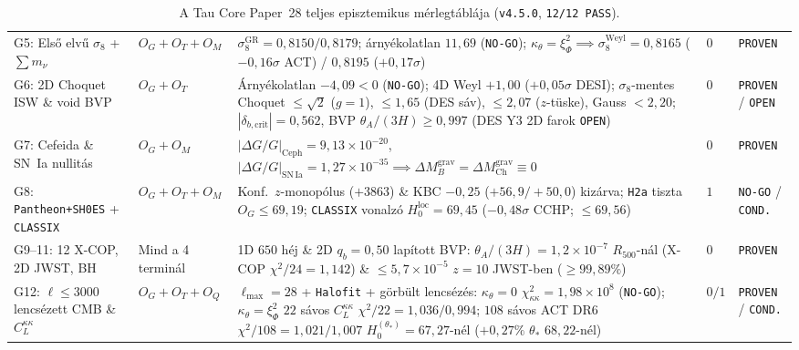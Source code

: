 \documentclass[11pt,a4paper]{article}
\begin{document}
\begin{table}[htbp]
{\begin{tabular}{ll>{\raggedright\arraybackslash}p{6.0cm}ll}
G5: Első elvű $\sigma_8$ + $\sum m_\nu$ & $O_G + O_T + O_M$ & $\sigma_8^{\mathrm{GR}} = 0{,}8150 / 0{,}8179$; árnyékolatlan $11{,}69$ ({\upshape\texttt{NO-GO}}); $\kappa_\theta = \xi_\Phi^2 \implies \sigma_8^{\mathrm{Weyl}} = 0{,}8165$ ($-0{,}16\sigma$ ACT) / $0{,}8195$ ($+0{,}17\sigma$) & $0$ & {\upshape\texttt{PROVEN}} \\
G6: 2D Choquet ISW \& void BVP & $O_G + O_T$ & Árnyékolatlan $-4{,}09 < 0$ ({\upshape\texttt{NO-GO}}); 4D Weyl $+1{,}00$ ($+0{,}05\sigma$ DESI); $\sigma_8$-mentes Choquet $\le \sqrt{2}$ ($g{=}1$), $\le 1{,}65$ (DES sáv), $\le 2{,}07$ ($z$-tüske), Gauss $< 2{,}20$; $|\delta_{b,\mathrm{crit}}| = 0{,}562$, BVP $\theta_A/(3H) \ge 0{,}997$ (DES Y3 2D farok {\upshape\texttt{OPEN}}) & $0$ & {\upshape\texttt{PROVEN}} / {\upshape\texttt{OPEN}} \\
G7: Cefeida \& SN~Ia nullitás & $O_G + O_M$ & $|\Delta G/G|_{\mathrm{Ceph}} = 9{,}13\times 10^{-20}$, $|\Delta G/G|_{\mathrm{SN\,Ia}} = 1{,}27\times 10^{-35} \implies \Delta M_B^{\mathrm{grav}} = \Delta M_{\mathrm{Ch}}^{\mathrm{grav}} \equiv 0$ & $0$ & {\upshape\texttt{PROVEN}} \\
G8: \texttt{Pantheon+SH0ES} + \texttt{CLASSIX} & $O_G + O_T + O_M$ & Konf.\ $z$-monopólus ($+3863$) \& KBC $-0{,}25$ ($+56{,}9 / +50{,}0$) kizárva; \texttt{H2a} tiszta $O_G \le 69{,}19$; \texttt{CLASSIX} vonalzó $H_0^{\mathrm{loc}} = 69{,}45$ ($-0{,}48\sigma$ CCHP; $\le 69{,}56$) & $1$ & {\upshape\texttt{NO-GO}} / {\upshape\texttt{COND.}} \\
G9--11: 12 X-COP, 2D JWST, BH & Mind a 4 terminál & 1D $650$ héj \& 2D $q_b = 0{,}50$ lapított BVP: $\theta_A/(3H) = 1{,}2\times 10^{-7}$ $R_{500}$-nál (X-COP $\chi^2/24 = 1{,}142$) \& $\le 5{,}7\times 10^{-5}$ $z=10$ JWST-ben ($\ge 99{,}89\%$) & $0$ & {\upshape\texttt{PROVEN}} \\
G12: $\ell \le 3000$ lencsézett CMB \& $C_L^{\kappa\kappa}$ & $O_G + O_T + O_Q$ & $\ell_{\max}{=}28$ + \texttt{Halofit} + görbült lencsézés: $\kappa_\theta{=}0$ $\chi^2_{\kappa\kappa}{=}1{,}98{\times}10^8$ ({\upshape\texttt{NO-GO}}); $\kappa_\theta{=}\xi_\Phi^2$ $22$ sávos $C_L^{\kappa\kappa}$ $\chi^2/22{=}1{,}036 / 0{,}994$; $108$ sávos ACT DR6 $\chi^2/108{=}1{,}021 / 1{,}007$ $H_0^{(\theta_*)}{=}67{,}27$-nél ($+0{,}27\%$ $\theta_*$ $68{,}22$-nél) & $0 / 1$ & {\upshape\texttt{PROVEN}} / {\upshape\texttt{COND.}} \\
\bottomrule
\end{tabular}%
}
\caption{A Tau Core Paper~28 teljes episztemikus mérlegtáblája (\texttt{v4.5.0}, \texttt{12/12 PASS}).}
\label{tab:epistemic-ledger}
\end{table}
\end{document}
